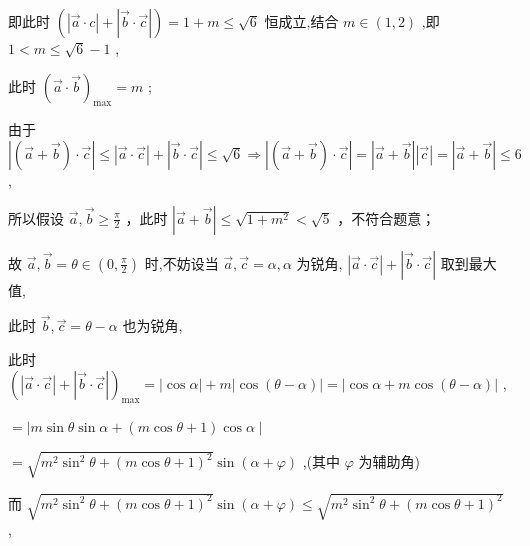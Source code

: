 \documentclass[10pt]{article}
\begin{document}
即此时 \(\left( {\left| {\overrightarrow{a} \cdot  c}\right|  + \left| {\overrightarrow{b} \cdot  \overrightarrow{c}}\right| }\right)  = 1 + m \leq  \sqrt{6}\) 恒成立,结合 \(m \in  \left( {1,2}\right)\) ,即 \(1 < m \leq  \sqrt{6} - 1\) ,

此时 \({\left( \overrightarrow{a} \cdot  \overrightarrow{b}\right) }_{\max } = m\) ;

由于 \(\left| {\left( {\overrightarrow{a} + \overrightarrow{b}}\right)  \cdot  \overrightarrow{c}}\right|  \leq  \left| {\overrightarrow{a} \cdot  \overrightarrow{c}}\right|  + \left| {\overrightarrow{b} \cdot  \overrightarrow{c}}\right|  \leq  \sqrt{6} \Rightarrow  \left| {\left( {\overrightarrow{a} + \overrightarrow{b}}\right)  \cdot  \overrightarrow{c}}\right|  = \left| {\overrightarrow{a} + \overrightarrow{b}}\right| \left| \overrightarrow{c}\right|  = \left| {\overrightarrow{a} + \overrightarrow{b}}\right|  \leq  6\) ,

所以假设 \(\overrightarrow{a},\overrightarrow{b} \geq  \frac{\pi }{2}\) ，此时 \(\left| {\overrightarrow{a} + \overrightarrow{b}}\right|  \leq  \sqrt{1 + {m}^{2}} < \sqrt{5}\) ，不符合题意；

故 \(\overrightarrow{a},\overrightarrow{b} = \theta  \in  \left( {0,\frac{\pi }{2}}\right)\) 时,不妨设当 \(\overrightarrow{a},\overrightarrow{c} = \alpha ,\alpha\) 为锐角, \(\left| {\overrightarrow{a} \cdot  \overrightarrow{c}}\right|  + \left| {\overrightarrow{b} \cdot  \overrightarrow{c}}\right|\) 取到最大值,

此时 \(\overrightarrow{b},\overrightarrow{c} = \theta  - \alpha\) 也为锐角,

此时 \({\left( \left| \overrightarrow{a} \cdot  \overrightarrow{c}\right|  + \left| \overrightarrow{b} \cdot  \overrightarrow{c}\right| \right) }_{\max } = \left| {\cos \alpha }\right|  + m\left| {\cos \left( {\theta  - \alpha }\right) }\right|  = \left| {\cos \alpha  + m\cos \left( {\theta  - \alpha }\right) }\right|\) ,

\(=  \mid  m\sin \theta \sin \alpha  + \left( {m\cos \theta  + 1}\right) \cos \alpha  \mid\)

\(= \sqrt{{m}^{2}{\sin }^{2}\theta  + {\left( m\cos \theta  + 1\right) }^{2}}\sin \left( {\alpha  + \varphi }\right)\) ,(其中 \(\varphi\) 为辅助角)

而 \(\sqrt{{m}^{2}{\sin }^{2}\theta  + {\left( m\cos \theta  + 1\right) }^{2}}\sin \left( {\alpha  + \varphi }\right)  \leq  \sqrt{{m}^{2}{\sin }^{2}\theta  + {\left( m\cos \theta  + 1\right) }^{2}}\) ,
\end{document}
